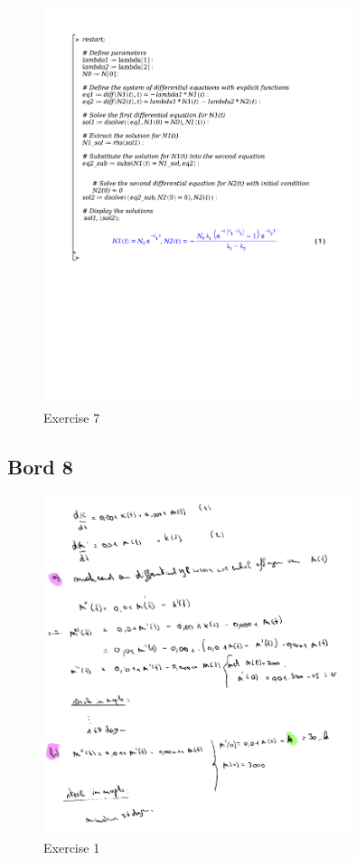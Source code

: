 \documentclass[a4paper]{report}
\begin{document}


\begin{figure}[H]
	\centering
	\includegraphics[width=0.8\textwidth]{exercises/ex_7_huis_8.pdf}
	\caption{Exercise 7}
	\label{fig:exercise_7_huis_8}
\end{figure}

\subsection*{Bord 8}

\begin{figure}[H]
	\centering
	\includegraphics[width=0.8\textwidth]{assets/bord_8_ex_1.png}
	\caption{Exercise 1}
	\label{fig:bord_8_ex_1}
\end{figure}
\end{document}
